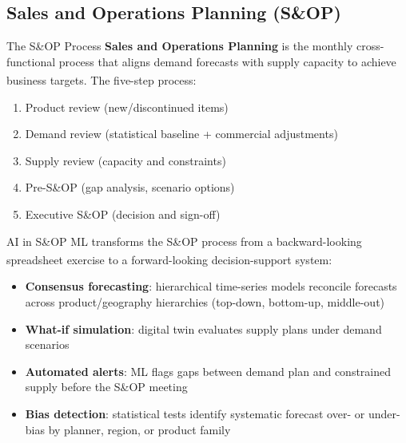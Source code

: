\subsection{Sales and Operations Planning (S\&OP)}


\begin{v3topic}{The S\&OP Process}
    \textbf{Sales and Operations Planning} is the monthly cross-functional process that aligns demand forecasts with supply capacity to achieve business targets\textsuperscript{\cite[][pp.~188--196]{chopraSupplyChainManagement2019}}.
    The five-step process:
    \begin{enumerate}
        \item Product review (new/discontinued items)
        \item Demand review (statistical baseline + commercial adjustments)
        \item Supply review (capacity and constraints)
        \item Pre-S\&OP (gap analysis, scenario options)
        \item Executive S\&OP (decision and sign-off)
    \end{enumerate}

\end{v3topic}
\begin{v3topic}{AI in S\&OP}
    ML transforms the S\&OP process from a backward-looking spreadsheet exercise to a forward-looking decision-support system\textsuperscript{\cite[][pp.~196--201]{chopraSupplyChainManagement2019}}:
    \begin{itemize}
        \item \textbf{Consensus forecasting}: hierarchical time-series models reconcile forecasts across product/geography hierarchies (top-down, bottom-up, middle-out)
        \item \textbf{What-if simulation}: digital twin evaluates supply plans under demand scenarios
        \item \textbf{Automated alerts}: ML flags gaps between demand plan and constrained supply before the S\&OP meeting
        \item \textbf{Bias detection}: statistical tests identify systematic forecast over- or under-bias by planner, region, or product family
    \end{itemize}

\end{v3topic}

